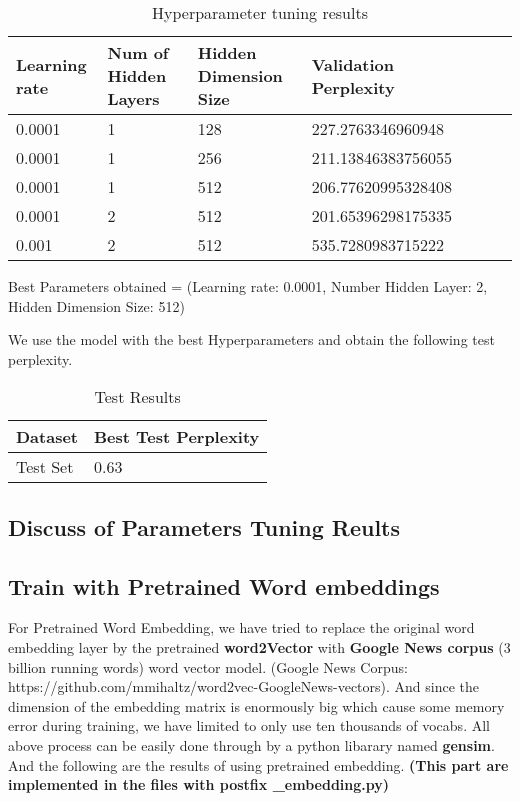 \documentclass{article}
\begin{document}
\begin{table}[htb]
	\caption{Hyperparameter tuning results}
	\label{sample-table}
	\centering
	\begin{tabular}{lllllll}
		\toprule
		\cmidrule{1-4}
		Learning rate & Num of Hidden Layers & Hidden Dimension Size & Validation Perplexity\\
		\midrule
		0.0001 & 1 & 128 & 227.2763346960948 \\
		0.0001 & 1  & 256 & 211.13846383756055  \\
		0.0001 & 1  & 512 & 206.77620995328408  \\
		0.0001 & 2 & 512 & 201.65396298175335  \\
		0.001 & 2  & 512 & 535.7280983715222  \\
		\bottomrule
	\end{tabular}
\end{table}

Best Parameters obtained = (Learning rate: 0.0001, Number Hidden Layer: 2, Hidden Dimension Size: 512)

We use the model with the best Hyperparameters and obtain the following test perplexity.

\pagebreak

\begin{table}[htb]
	\caption{Test Results}
	\label{sample-table}
	\centering
	\begin{tabular}{ll}
		\toprule
		\cmidrule{1-2}
		Dataset & Best Test Perplexity\\
		\midrule
		Test Set & 0.63   \\
		\bottomrule
	\end{tabular}
\end{table}

\subsection{Discuss of Parameters Tuning Reults}

\subsection{Train with Pretrained Word embeddings}
For Pretrained Word Embedding, we have tried to replace the original word embedding layer by the pretrained \textbf{word2Vector} with \textbf{Google News corpus} (3 billion running words) word vector model. (Google News Corpus: https://github.com/mmihaltz/word2vec-GoogleNews-vectors). And since the dimension of the embedding matrix is enormously big which cause some memory error during training, we have limited to only use ten thousands of vocabs. All above process can be easily done through by a python libarary named \textbf{gensim}. And the following are the results of using pretrained embedding. \textbf{(This part are implemented in the files with postfix \_embedding.py)}
\end{document}
